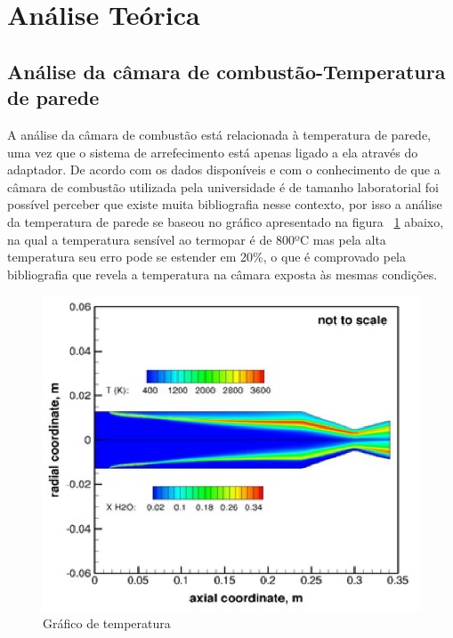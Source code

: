 \section{Análise Teórica}
\subsection{Análise da câmara de combustão-Temperatura de parede}
A análise da câmara de combustão está relacionada à temperatura de parede, uma vez que o sistema de arrefecimento está apenas ligado a ela através do adaptador. De acordo com os dados disponíveis e com o conhecimento de que a câmara de combustão utilizada pela universidade é de tamanho laboratorial foi possível perceber que existe muita bibliografia nesse contexto, por isso a análise da temperatura de parede se baseou no gráfico apresentado na figura ~\ref{fig1tc} abaixo, na qual a temperatura sensível ao termopar é de 800ºC mas pela alta temperatura seu erro pode se estender em 20\%, o que é comprovado pela bibliografia que revela a temperatura na câmara exposta às mesmas condições.
\begin{figure}[!htb]                  
	\centering                          
	\includegraphics[scale=1]{figuras/Figura1tc.eps}
	\caption{Gráfico de temperatura}\label{fig1tc}               
\end{figure}
\newpage
